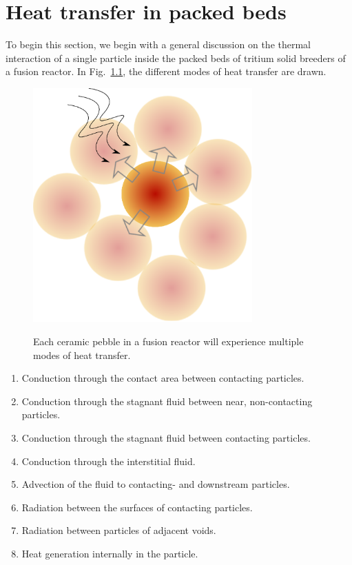 \chapter{Heat transfer in packed beds} \label{ch:modeling-heat-transfer}
To begin this section, we begin with a general discussion on the thermal interaction of a single particle inside the packed beds of tritium solid breeders of a fusion reactor. In Fig.~\ref{fig:peb-comp-ht}, the different modes of heat transfer are drawn.

\begin{figure}[t]
	\centering
	\caption{Each ceramic pebble in a fusion reactor will experience multiple modes of heat transfer.}
	\includegraphics[width=0.75\textwidth]{chapters/figures/pebble-complete-heat-transfer}\label{fig:peb-comp-ht}
\end{figure}



\begin{enumerate}
\item Conduction through the contact area between contacting particles.
\item Conduction through the stagnant fluid between near, non-contacting particles.
\item Conduction through the stagnant fluid between contacting particles.
\item Conduction through the interstitial fluid. 
\item Advection of the fluid to contacting- and downstream particles.
\item Radiation between the surfaces of contacting particles.
\item Radiation between particles of adjacent voids.
\item Heat generation internally in the particle.
\end{enumerate}

